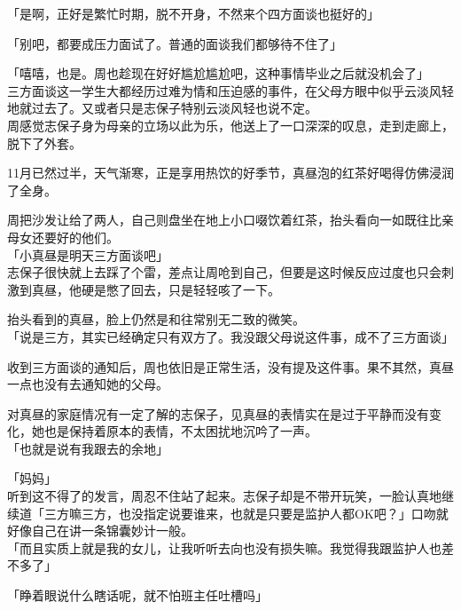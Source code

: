 「是啊，正好是繁忙时期，脱不开身，不然来个四方面谈也挺好的」

「别吧，都要成压力面试了。普通的面谈我们都够待不住了」

「嘻嘻，也是。周也趁现在好好尴尬尴尬吧，这种事情毕业之后就没机会了」\\

三方面谈这一学生大都经历过难为情和压迫感的事件，在父母方眼中似乎云淡风轻地就过去了。又或者只是志保子特别云淡风轻也说不定。\\

周感觉志保子身为母亲的立场以此为乐，他送上了一口深深的叹息，走到走廊上，脱下了外套。\\

\vspace{2\baselineskip}

11月已然过半，天气渐寒，正是享用热饮的好季节，真昼泡的红茶好喝得仿佛浸润了全身。

周把沙发让给了两人，自己则盘坐在地上小口啜饮着红茶，抬头看向一如既往比亲母女还要好的他们。\\

「小真昼是明天三方面谈吧」\\

志保子很快就上去踩了个雷，差点让周呛到自己，但要是这时候反应过度也只会刺激到真昼，他硬是憋了回去，只是轻轻咳了一下。

抬头看到的真昼，脸上仍然是和往常别无二致的微笑。\\

「说是三方，其实已经确定只有双方了。我没跟父母说这件事，成不了三方面谈」

收到三方面谈的通知后，周也依旧是正常生活，没有提及这件事。果不其然，真昼一点也没有去通知她的父母。

对真昼的家庭情况有一定了解的志保子，见真昼的表情实在是过于平静而没有变化，她也是保持着原本的表情，不太困扰地沉吟了一声。\\

「也就是说有我跟去的余地」

「妈妈」\\

听到这不得了的发言，周忍不住站了起来。志保子却是不带开玩笑，一脸认真地继续道「三方嘛三方，也没指定说要谁来，也就是只要是监护人都OK吧？」口吻就好像自己在讲一条锦囊妙计一般。\\

「而且实质上就是我的女儿，让我听听去向也没有损失嘛。我觉得我跟监护人也差不多了」

「睁着眼说什么瞎话呢，就不怕班主任吐槽吗」

